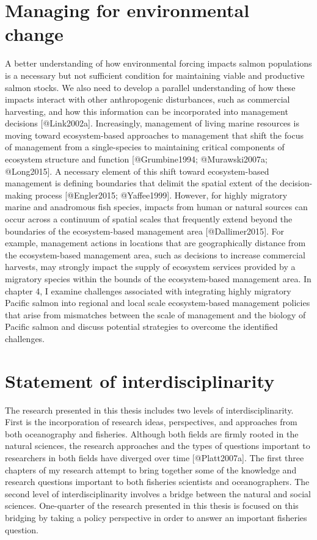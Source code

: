 \section{Managing for environmental
change}\label{managing-for-environmental-change}

A better understanding of how environmental forcing impacts salmon
populations is a necessary but not sufficient condition for maintaining
viable and productive salmon stocks. We also need to develop a parallel
understanding of how these impacts interact with other anthropogenic
disturbances, such as commercial harvesting, and how this information
can be incorporated into management decisions {[}@Link2002a{]}.
Increasingly, management of living marine resources is moving toward
ecosystem-based approaches to management that shift the focus of
management from a single-species to maintaining critical components of
ecosystem structure and function {[}@Grumbine1994; @Murawski2007a;
@Long2015{]}. A necessary element of this shift toward ecosystem-based
management is defining boundaries that delimit the spatial extent of the
decision-making process {[}@Engler2015; @Yaffee1999{]}. However, for
highly migratory marine and anadromous fish species, impacts from human
or natural sources can occur across a continuum of spatial scales that
frequently extend beyond the boundaries of the ecosystem-based
management area {[}@Dallimer2015{]}. For example, management actions in
locations that are geographically distance from the ecosystem-based
management area, such as decisions to increase commercial harvests, may
strongly impact the supply of ecosystem services provided by a migratory
species within the bounds of the ecosystem-based management area. In
chapter 4, I examine challenges associated with integrating highly
migratory Pacific salmon into regional and local scale ecosystem-based
management policies that arise from mismatches between the scale of
management and the biology of Pacific salmon and discuss potential
strategies to overcome the identified challenges.

\section{Statement of
interdisciplinarity}\label{statement-of-interdisciplinarity}

The research presented in this thesis includes two levels of
interdisciplinarity. First is the incorporation of research ideas,
perspectives, and approaches from both oceanography and fisheries.
Although both fields are firmly rooted in the natural sciences, the
research approaches and the types of questions important to researchers
in both fields have diverged over time {[}@Platt2007a{]}. The first
three chapters of my research attempt to bring together some of the
knowledge and research questions important to both fisheries scientists
and oceanographers. The second level of interdisciplinarity involves a
bridge between the natural and social sciences. One-quarter of the
research presented in this thesis is focused on this bridging by taking
a policy perspective in order to answer an important fisheries question.

